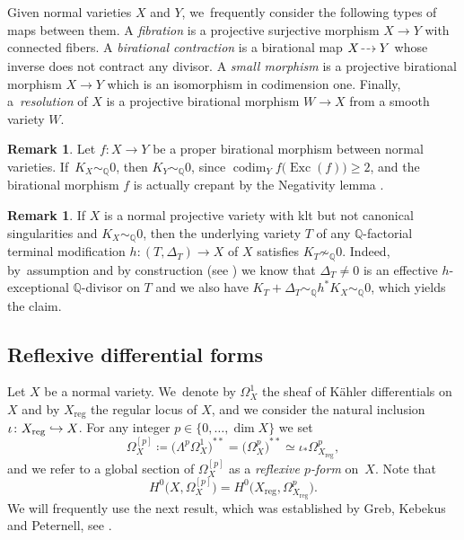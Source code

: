 \documentclass[JEP,XML,SOM,Unicode,published]{cedram}
\newcommand\hto{\mathrel{\lhook\joinrel\to}}
\newcommand{\dradpl}{{\hspace*{-2.5mm}\begin{tikzcd}[ampersand replacement=\&,column sep = scriptsize]\mbox{}\ar[r,dashed]\&\mbox{}\end{tikzcd}\hspace*{-2.5mm}}}
\newcommand{\dratst}{{\hspace*{-2.5mm}\begin{tikzcd}[ampersand replacement=\&,column sep = small]\mbox{}\ar[r,dashed]\&\mbox{}\end{tikzcd}\hspace*{-2mm}}}
\let\drascst\dratst
\newcommand{\dra}{\mathchoice{\dradpl}{\dratst}{\drascst}{\drascst}}
\theoremstyle{plain}
\theoremstyle{definition}
\newtheorem{rem}[thm]{Remark}
\newcommand{\Q}{\mathbb{Q}}
\DeclareMathOperator{\codim}{codim}
\DeclareMathOperator{\Exc}{Exc}
\begin{document}
Given normal varieties $X$ and $Y$, we~frequently consider the following types of maps between them. A \emph{fibration} is a projective surjective morphism $X \to Y$ with connected fibers. A \emph{birational contraction} is a birational map $X \dra Y$ whose inverse does not contract any divisor. A \emph{small morphism} is a projective birational morphism $X \to Y$ which is an isomorphism in codimension one.
Finally, a~\emph{resolution} of $X$ is a projective birational morphism $W \to X$ from a smooth variety $W$.

\begin{rem}
\label{rem:contraction_from_K-trivial}
Let $f \colon X \to Y$ be a proper birational morphism between normal varieties. If~$K_X \sim_\Q 0$, then $K_Y \sim_\Q 0$, since $\codim_Y f \bigl(\Exc(f) \bigr) \geq 2$, and the birational morphism $f$ is actually crepant by the Negativity lemma \cite[Lem.\,3.39(1)]{KM98}.
\end{rem}

\begin{rem}
\label{rem:Q-fact_very_sing}
If $X$ is a normal projective variety with klt but not canonical singularities and $K_X \sim_\Q 0$, then the underlying variety $T$ of any $\Q$\nobreakdash-factorial terminal modification $h \colon (T, \Delta_T) \to X$ of $X$ satisfies $K_T \not\sim_\Q 0$. Indeed, by~assumption and by construction (see \cite[Cor.\,1.4.3]{BCHM10}) we know that $\Delta_T \neq 0$ is an effective $h$\nobreakdash-exceptional $\Q$\nobreakdash-divisor on $T$ and we also have $K_T + \Delta_T \sim_\Q h^* K_X \sim_\Q 0$, which yields the claim.
\end{rem}

\subsection{Reflexive differential forms}

Let $X$ be a normal variety. We~denote by $\Omega^1_X$ the sheaf of Kähler differentials on~$X$ and by $X_\text{reg}$ the regular locus of $X$, and we consider the natural inclusion $\iota \colon X_\text{reg} \hto X$. For any integer $p \in \{ 0, \dots, \dim X \}$ we set
\[
\Omega_X^{[p]} \coloneqq \bigl(\Lambda^p \Omega_X^1 \bigr)^{**} = \bigl(\Omega_X^p \bigr)^{**} \simeq \iota_* \Omega_{X_\text{reg}}^p,
\]
and we refer to a global section of $\Omega_X^{[p]}$ as a \emph{reflexive $p$-form} on~$X$.
Note that
\[
H^0 \bigl(X, \Omega_X^{[p]} \bigr) = H^0 \bigl(X_\text{reg}, \Omega^p_{X_\text{reg}} \bigr).
\]
We will frequently use the next result, which was established by Greb, Kebekus and Peternell, see \cite[Prop.\,6.9]{GKP16b}.
\end{document}
